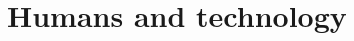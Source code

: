 \chapter{Humans and technology} \label{chap:humans_and_technology}
\todo

\vfill \minitoc \newpage




